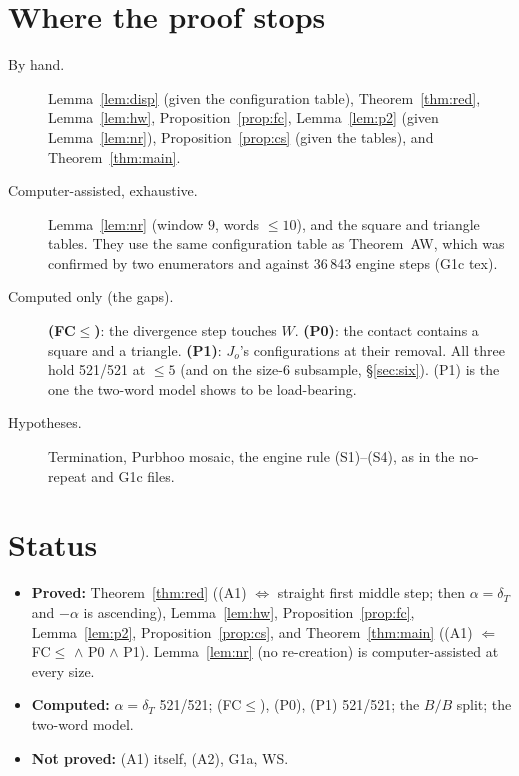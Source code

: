 \documentclass[11pt]{article}
\theoremstyle{definition}\newtheorem{definition}[theorem]{Definition}\newtheorem{remark}[theorem]{Remark}
\begin{document}
\section{Where the proof stops}\label{sec:gaps}
\begin{description}
\item[By hand.] Lemma~\ref{lem:disp} (given the configuration table), Theorem~\ref{thm:red}, Lemma~\ref{lem:hw}, Proposition~\ref{prop:fc}, Lemma~\ref{lem:p2} (given Lemma~\ref{lem:nr}), Proposition~\ref{prop:cs} (given the tables), and Theorem~\ref{thm:main}.
\item[Computer-assisted, exhaustive.] Lemma~\ref{lem:nr} (window $9$, words $\le10$), and the square and triangle tables. They use the same configuration table as Theorem~AW, which was confirmed by two enumerators and against 36\,843 engine steps (G1c tex).
\item[Computed only (the gaps).] \textbf{(FC$\le$)}: the divergence step touches $W$. \textbf{(P0)}: the contact contains a square and a triangle. \textbf{(P1)}: $J_o$'s configurations at their removal. All three hold 521/521 at $\le5$ (and on the size-6 subsample, \S\ref{sec:six}). (P1) is the one the two-word model shows to be load-bearing.
\item[Hypotheses.] Termination, Purbhoo mosaic, the engine rule (S1)--(S4), as in the no-repeat and G1c files.
\end{description}

\section*{Status}
\begin{itemize}
\item \textbf{Proved:} Theorem~\ref{thm:red} ((A1) $\iff$ straight first middle step; then $\alpha=\delta_T$ and $-\alpha$ is ascending), Lemma~\ref{lem:hw}, Proposition~\ref{prop:fc}, Lemma~\ref{lem:p2}, Proposition~\ref{prop:cs}, and Theorem~\ref{thm:main} ((A1) $\Leftarrow$ FC$\le$ $\wedge$ P0 $\wedge$ P1). Lemma~\ref{lem:nr} (no re-creation) is computer-assisted at every size.
\item \textbf{Computed:} $\alpha=\delta_T$ 521/521; (FC$\le$), (P0), (P1) 521/521; the $B/B$ split; the two-word model.
\item \textbf{Not proved:} (A1) itself, (A2), G1a, WS.
\end{itemize}
\end{document}
